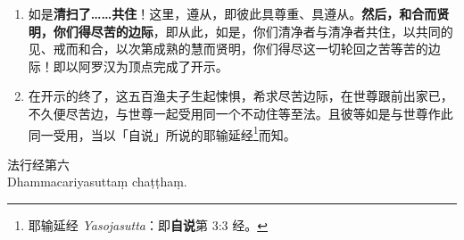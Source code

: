 \begin{enumerate}\item 如是\textbf{清扫了……共住}！这里，遵从，即彼此具尊重、具遵从。\textbf{然后，和合而贤明，你们得尽苦的边际}，即从此，如是，你们清净者与清净者共住，以共同的见、戒而和合，以次第成熟的慧而贤明，你们得尽这一切轮回之苦等苦的边际！即以阿罗汉为顶点完成了开示。
\item 在开示的终了，这五百渔夫子生起悚惧，希求尽苦边际，在世尊跟前出家已，不久便尽苦边，与世尊一起受用同一个不动住等至法。且彼等如是与世尊作此同一受用，当以「自说」所说的耶输延经\footnote{耶输延经 \textit{Yasojasutta}：即\textbf{自说}第 3:3 经。}而知。\end{enumerate}

\begin{center}\vspace{1em}法行经第六\\Dhammacariyasuttaṃ chaṭṭhaṃ.\end{center}